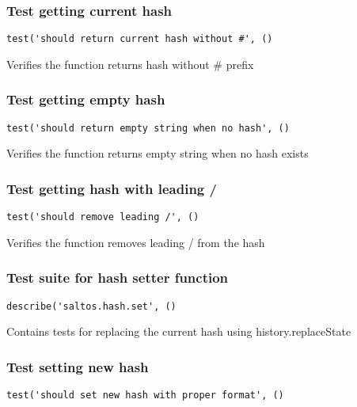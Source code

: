 \documentclass[a4paper]{article}
\begin{document}
\subsubsection{Test getting current hash}

\begin{lstlisting}
test('should return current hash without #', ()
\end{lstlisting}

Verifies the function returns hash without \# prefix

\hypertarget{toc201}{}
\subsubsection{Test getting empty hash}

\begin{lstlisting}
test('should return empty string when no hash', ()
\end{lstlisting}

Verifies the function returns empty string when no hash exists

\hypertarget{toc202}{}
\subsubsection{Test getting hash with leading /}

\begin{lstlisting}
test('should remove leading /', ()
\end{lstlisting}

Verifies the function removes leading / from the hash

\hypertarget{toc203}{}
\subsubsection{Test suite for hash setter function}

\begin{lstlisting}
describe('saltos.hash.set', ()
\end{lstlisting}

Contains tests for replacing the current hash
using history.replaceState

\hypertarget{toc204}{}
\subsubsection{Test setting new hash}

\begin{lstlisting}
test('should set new hash with proper format', ()
\end{lstlisting}
\end{document}
